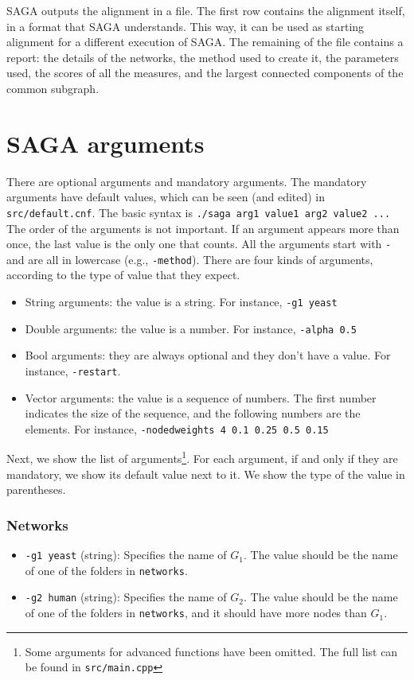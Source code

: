 \documentclass[]{article}
\begin{document}
SAGA outputs the alignment in a file. The first row contains the alignment itself, in a format that SAGA understands. This way, it can be used as starting alignment for a different execution of SAGA. The remaining of the file contains a report: the details of the networks, the method used to create it, the parameters used, the scores of all the measures, and the largest connected components of the common subgraph.


\section{SAGA arguments}\label{b:args}
There are optional arguments and mandatory arguments. The mandatory arguments have default values, which can be seen (and edited) in \texttt{src/default.cnf}. The basic syntax is \texttt{./saga arg1 value1 arg2 value2 ...} The order of the arguments is not important. If an argument appears more than once, the last value is the only one that counts. All the arguments start with \texttt{-} and are all in lowercase (e.g., \texttt{-method}). There are four kinds of arguments, according to the type of value that they expect.
\begin{itemize}
\item String arguments: the value is a string. For instance, \texttt{-g1 yeast}
\item Double arguments: the value is a number. For instance, \texttt{-alpha 0.5}
\item Bool arguments: they are always optional and they don't have a value. For instance, \texttt{-restart}.
\item Vector arguments: the value is a sequence of numbers. The first number indicates the size of the sequence, and the following numbers are the elements. For instance, \texttt{-nodedweights 4 0.1 0.25 0.5 0.15}
\end{itemize}

Next, we show the list of arguments\footnote{Some arguments for advanced functions have been omitted. The full list can be found in \texttt{src/main.cpp}}. For each argument, if and only if they are mandatory, we show its default value next to it. We show the type of the value in parentheses.
\subsubsection*{Networks}
\begin{itemize}
\item\texttt{-g1 yeast} (string): Specifies the name of $G_1$. The value should be the name of one of the folders in \texttt{networks}.
\item\texttt{-g2 human} (string): Specifies the name of $G_2$. The value should be the name of one of the folders in \texttt{networks}, and it should have more nodes than $G_1$.
\end{itemize}
\end{document}
